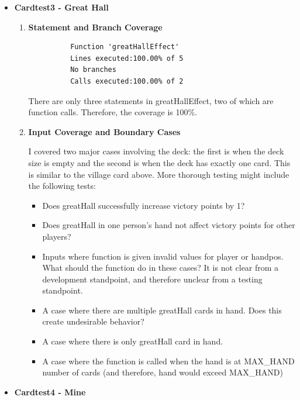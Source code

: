 \documentclass[11pt,letterpaper]{article}
\begin{document}
\begin{enumerate}[label=\Roman*.]
\begin{itemize}[leftmargin=*]
      \item \textbf{Cardtest3 - Great Hall}
      
        \begin{enumerate}[leftmargin=*]
          \item \textbf{Statement and Branch Coverage}

          \begin{lstlisting}
          Function 'greatHallEffect'
          Lines executed:100.00% of 5
          No branches
          Calls executed:100.00% of 2
          \end{lstlisting}
          
            There are only three statements in greatHallEffect, two of which are
            function calls. Therefore, the coverage is 100\%.

        \item \textbf{Input Coverage and Boundary Cases}

          I covered two major cases involving the deck: the first is when the deck size is empty and 
            the second is when the deck has exactly one card. This is similar to the village card
            above. More thorough testing might include the following tests:
          \begin{itemize}
            \item Does greatHall successfully increase victory points by 1?
            \item Does greatHall in one person's hand not affect victory points for other players?
            \item Inputs where function is given invalid values for player or handpos. What
                should the function do in these cases? It is not clear from a development
                standpoint, and therefore unclear from a testing standpoint. 
            \item A case where there are multiple greatHall cards in hand. Does this create
              undesirable behavior?
            \item A case where there is only greatHall card in hand.
            \item A case where the function is called when the hand is at MAX\_HAND number of cards (and therefore, hand would exceed MAX\_HAND)
          \end{itemize}
        \end{enumerate}

      \item \textbf{Cardtest4 - Mine}
      

\end{itemize}
\end{enumerate}
\end{document}
